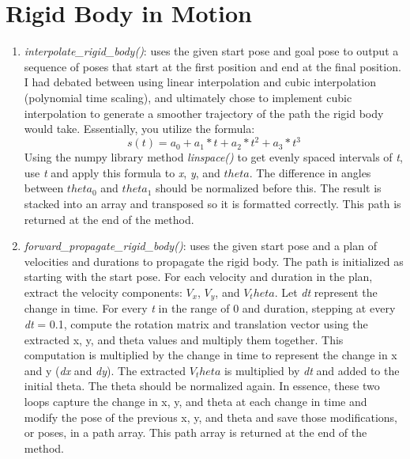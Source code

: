 \documentclass{article}
\begin{document}
\section{Rigid Body in Motion}
\begin{enumerate}
\item \textit{interpolate\_rigid\_body()}: uses the given start pose and goal pose to output a sequence of poses that start at the first position and end at the final position. I had debated between using linear interpolation and cubic interpolation (polynomial time scaling), and ultimately chose to implement cubic interpolation to generate a smoother trajectory of the path the rigid body would take. Essentially, you utilize the formula:
\[s(t)=a_0+a_1*t+a_2*t^2+a_3*t^3\]
Using the numpy library method \textit{linspace()} to get evenly spaced intervals of \textit{t}, use \textit{t} and apply this formula to \textit{x}, \textit{y}, and \(theta\). The difference in angles between \(theta_0\) and \(theta_1\) should be normalized before this. The result is stacked into an array and transposed so it is formatted correctly. This path is returned at the end of the method.

\item \textit{forward\_propagate\_rigid\_body()}: uses the given start pose and a plan of velocities and durations to propagate the rigid body. The path is initialized as starting with the start pose. For each velocity and duration in the plan, extract the velocity components: \(V_x\), \(V_y\), and \(V_theta\). Let \textit{dt} represent the change in time. For every \textit{t} in the range of 0 and duration, stepping at every \textit{dt} = 0.1, compute the rotation matrix and translation vector using the extracted x, y, and theta values and multiply them together. This computation is multiplied by the change in time to represent the change in x and y (\textit{dx} and \textit{dy}). The extracted \(V_theta\) is multiplied by \textit{dt} and added to the initial theta. The theta should be normalized again. In essence, these two loops capture the change in x, y, and theta at each change in time and modify the pose of the previous x, y, and theta and save those modifications, or poses, in a path array. This path array is returned at the end of the method.


\end{enumerate}
\end{document}
